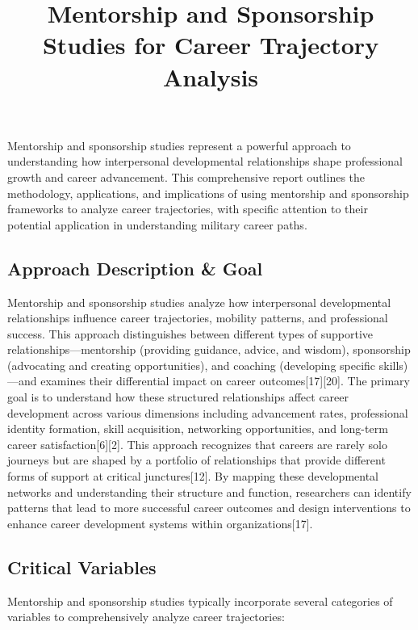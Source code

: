 \documentclass[
  letterpaper,
  DIV=11,
  numbers=noendperiod]{scrartcl}
\title{Mentorship and Sponsorship Studies for Career Trajectory
Analysis}
\author{}
\date{}
\begin{document}
\maketitle


Mentorship and sponsorship studies represent a powerful approach to
understanding how interpersonal developmental relationships shape
professional growth and career advancement. This comprehensive report
outlines the methodology, applications, and implications of using
mentorship and sponsorship frameworks to analyze career trajectories,
with specific attention to their potential application in understanding
military career paths.

\subsection{Approach Description \&
Goal}\label{approach-description-goal}

Mentorship and sponsorship studies analyze how interpersonal
developmental relationships influence career trajectories, mobility
patterns, and professional success. This approach distinguishes between
different types of supportive relationships---mentorship (providing
guidance, advice, and wisdom), sponsorship (advocating and creating
opportunities), and coaching (developing specific skills)---and examines
their differential impact on career outcomes{[}17{]}{[}20{]}. The
primary goal is to understand how these structured relationships affect
career development across various dimensions including advancement
rates, professional identity formation, skill acquisition, networking
opportunities, and long-term career satisfaction{[}6{]}{[}2{]}. This
approach recognizes that careers are rarely solo journeys but are shaped
by a portfolio of relationships that provide different forms of support
at critical junctures{[}12{]}. By mapping these developmental networks
and understanding their structure and function, researchers can identify
patterns that lead to more successful career outcomes and design
interventions to enhance career development systems within
organizations{[}17{]}.

\subsection{Critical Variables}\label{critical-variables}

Mentorship and sponsorship studies typically incorporate several
categories of variables to comprehensively analyze career trajectories:
\end{document}
